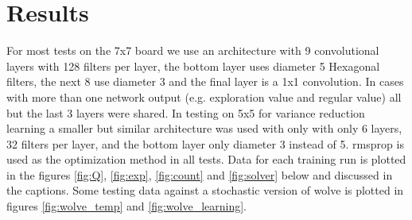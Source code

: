\documentclass{article}
\begin{document}
\section*{Results}
For most tests on the 7x7 board we use an architecture with 9 convolutional layers with 128 filters per layer, the bottom layer uses diameter 5 Hexagonal filters, the next 8 use diameter 3 and the final layer is a 1x1 convolution. In cases with more than one network output (e.g. exploration value and regular value) all but the last 3 layers were shared. In testing on 5x5 for variance reduction learning a smaller but similar architecture was used with only with only 6 layers, 32 filters per layer, and the bottom layer only diameter 3 instead of 5. rmsprop is used as the optimization method in all tests. Data for each training run is plotted in the figures \ref{fig:Q}, \ref{fig:exp}, \ref{fig:count} and \ref{fig:solver} below and discussed in the captions. Some testing data against a stochastic version of wolve \cite{wolve} is plotted in figures \ref{fig:wolve_temp} and \ref{fig:wolve_learning}.
\end{document}

